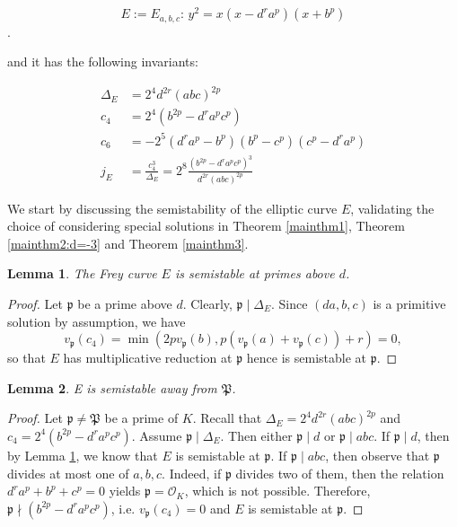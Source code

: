 \documentclass[]{article}
\newtheorem{lemma}{Lemma}
\newcommand {\mcalO}{{\mathcal{O}}}
\newcommand {\mfp}{{\mathfrak{P}}}
\begin{document}
\begin{equation}\label{frey}
   \text{$E:=E_{a,b,c}$:      } y^2=x(x-d^r a^p)(x+b^p)
\end{equation}.

and it has the following invariants:

\begin{align*}
   \Delta_E &=2^{4}d^{2r}(abc)^{2p}\\
c_4 &= 2^4(b^{2p}-d^ra^pc^p)\\
c_6 &= -2^5(d^ra^p-b^p)(b^p-c^p)(c^p-d^ra^p)\\
j_E&=\frac{c^3_4}{\Delta_E}=2^8\frac{(b^{2p}-d^ra^pc^p)^3}{d^{2r}(abc)^{2p}}
\end{align*}

We start by discussing the semistability of the elliptic curve $E$, validating the choice of considering special solutions in Theorem \ref{mainthm1}, Theorem \ref{mainthm2:d=-3} and Theorem \ref{mainthm3}.

\begin{lemma}\label{semsq}
The Frey curve $E$ is semistable at primes above $d$.   
\end{lemma}

\begin{proof}
  Let $\mathfrak{p}$ be a prime above $d$. Clearly, $\mathfrak{p}\mid \Delta_E$. Since $(da,b,c)$ is a primitive solution by assumption, we have $$v_{\mathfrak{p}}(c_4)=\min(2pv_{\mathfrak{p}}(b), p(v_{\mathfrak{p}}(a)+v_{\mathfrak{p}}(c))+r)=0,$$so that $E$ has multiplicative reduction at $\mathfrak{p}$ hence is semistable at $\mathfrak{p}$.
\end{proof}

\begin{lemma}\label{Esem}
 E is semistable away from $\mfp$.
\end{lemma}

\begin{proof}
Let $\mathfrak{p}\ne \mfp$ be a prime of $K$. Recall that $\Delta_E = 2^{4}d^{2r}(abc)^{2p}$ and $c_4 = 2^4(b^{2p}-d^ra^pc^p)$. Assume $\mathfrak{p}\mid \Delta_E$. Then either $\mathfrak{p}\mid d$ or $\mathfrak{p}\mid abc$. If $\mathfrak{p}\mid d$, then by Lemma \ref{semsq}, we know that $E$ is semistable at $\mathfrak{p}$. If $\mathfrak{p}\mid abc$, then observe that $\mathfrak{p}$ divides at most one of $a,b,c$. Indeed, if $\mathfrak{p} $ divides two of them, then the relation $d^ra^p+b^p+c^p=0$ yields $\mathfrak{p} =\mcalO_K$, which is not possible. Therefore, $\mathfrak{p}\nmid (b^{2p}-d^ra^pc^p)$, i.e. $v_{\mathfrak{p}}(c_4)=0$ and $E$ is semistable at $\mathfrak{p}$. 
\end{proof}
\end{document}
